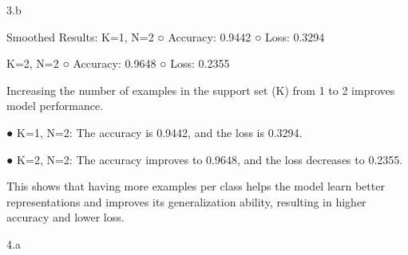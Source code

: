 \clearpage

\LARGE
3.b
\normalsize

\begin{answer}
    Smoothed Results:
K=1, N=2
○ Accuracy: 0.9442
○ Loss: 0.3294

K=2, N=2
○ Accuracy: 0.9648
○ Loss: 0.2355

Increasing the number of examples in the support set (K) from 1 to 2 improves model performance.

● K=1, N=2: The accuracy is 0.9442, and the loss is 0.3294.

● K=2, N=2: The accuracy improves to 0.9648, and the loss decreases to 0.2355.

This shows that having more examples per class helps the model learn better representations and improves its generalization ability, resulting in higher accuracy and lower loss.
\end{answer}

\clearpage

\LARGE
4.a
\normalsize

